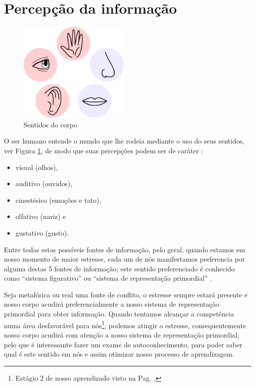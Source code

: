
\section{Percepção da informação}
\label{sec:percepcionaprendizagem}

\begin{figure}
  \centering
    \includegraphics[width=0.48\textwidth]{chapters/cap-learning/sentidos.eps} 
  \caption{Sentidos do corpo.}
\label{fig:5sentidos}
\end{figure}
O ser humano entende o mundo que lhe rodeia mediante o uso do seus sentidos,
ver Figura \ref{fig:5sentidos},
de modo que suas percepções podem ser de caráter \cite[pp. 28]{ready2010pnl}:
\begin{itemize}
\item visual (olhos), 
\item auditivo (ouvidos),
\item cinestésico (emoções e tato), 
\item olfativo (nariz) e
\item gustativo (gusto).
\end{itemize}

Entre todas estas possíveis fontes de informação,
pelo geral, quando estamos em nosso momento de maior estresse,
cada um de nós manifestamos preferencia por alguma destas 5 fontes de informação;
este sentido preferenciado é conhecido como ``sistema figurativo'' ou ``sistema de representação primordial''
\cite[pp. 28]{ready2010pnl}.


Seja metafórica ou real uma fonte de conflito, o estresse sempre estará presente 
e nosso corpo acudirá preferencialmente a nosso sistema de representação primordial para obter informação.
Quando tentamos alcançar a competência numa área desfavorável para nós\footnote{Estágio 
2 de nosso aprendizado visto na Pag. \pageref{ref:IncompetenciaConsciente}.},
podemos atingir o estresse, consequentemente nosso corpo acudirá com atenção a 
nosso sistema de representação primordial;
pelo que é interessante fazer um exame de autoconhecimento, 
para poder saber qual é este sentido em nós e assim otimizar nosso processo de aprendizagem.

